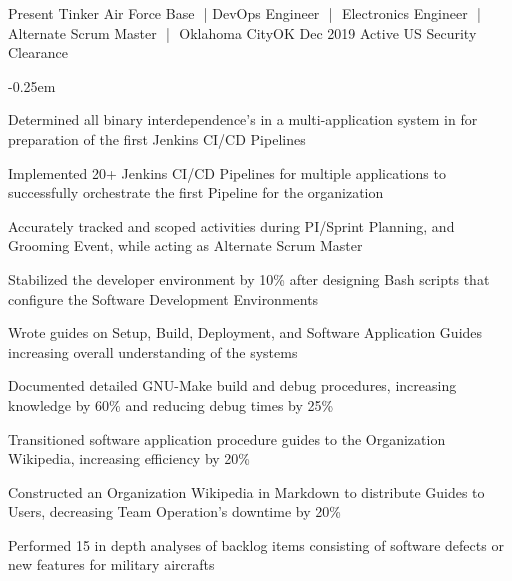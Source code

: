 %
%
%

\textbf{}

\vspace*{-.75em}
\begin{experiences} 

  \consultantexperience
     {Present} {Tinker Air Force Base\,\, |\,\,DevOps Engineer\,\, |\,\, Electronics Engineer\,\, |\,\, Alternate Scrum Master \,\,|\,\, Oklahoma City}{OK}{} 
     {Dec 2019} {Active US Security Clearance}
    {} 
        {\begin{description}[font=$\bullet$\scshape\bfseries]\small
            \itemsep-0.25em 
            \item Determined all binary interdependence's in a multi-application system in for preparation of the first Jenkins CI/CD Pipelines
            \item Implemented 20+ Jenkins CI/CD Pipelines for multiple applications to successfully orchestrate the first Pipeline for the organization
            \item Accurately tracked and scoped activities during PI/Sprint Planning, and Grooming Event, while acting as Alternate Scrum Master 
            \item Stabilized the developer environment by 10\% after designing Bash scripts that configure the Software Development Environments
            \item Wrote guides on Setup, Build, Deployment, and Software Application Guides increasing overall understanding of the systems
            \item Documented detailed GNU-Make build and debug procedures, increasing knowledge by 60\% and reducing debug times by 25\%
            \item Transitioned software application procedure guides to the Organization Wikipedia, increasing efficiency by 20\% 
            \item Constructed an Organization Wikipedia in Markdown to distribute Guides to Users, decreasing Team Operation's downtime by 20\%
            \item Performed 15 in depth analyses of backlog items consisting of software defects or new features for military aircrafts

\end{description}}
\end{experiences}
